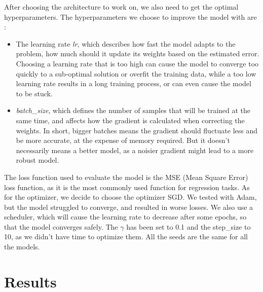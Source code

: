 \documentclass[10pt,conference]{IEEEtran}
\begin{document}
After choosing the architecture to work on, we also need to get the optimal hyperparameters. The hyperparameters we choose to improve the model with are :
\begin{itemize}
  \item The learning rate \textit{lr}, which describes how fast the model adapts to the problem, how much should it update its weights based on the estimated error. Choosing a learning rate that is too high can cause the model to converge too quickly to a sub-optimal solution or overfit the training data, while a too low learning rate results in a long training process, or can even cause the model to be stuck.
  \item \textit{batch\_size}, which defines the number of samples that will be trained at the same time, and affects how the gradient is calculated when correcting the weights. In short, bigger batches means the gradient should fluctuate less and be more accurate, at the expense of memory required. But it doesn't necessarily means a better model, as a noisier gradient might lead to a more robust model.
\end{itemize}
 
The loss function used to evaluate the model is the MSE (Mean Square Error) loss function, as it is the most commonly used function for regression tasks. As for the optimizer, we decide to choose the optimizer SGD. We tested with Adam, but the model struggled to converge, and resulted in worse losses. We also use a scheduler, which will cause the learning rate to decrease after some epochs, so that the model converges safely. The $\gamma$ has been set to 0.1 and the step\_size to 10, as we didn't have time to optimize them. All the seeds are the same for all the models.


\section{Results}
\end{document}
